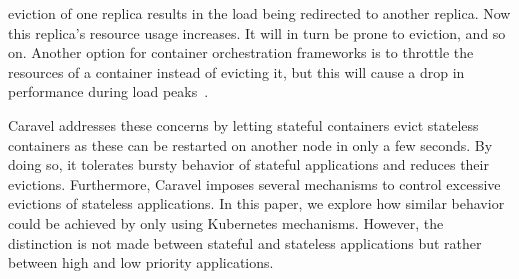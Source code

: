 eviction of one replica results in the load being redirected to another replica. Now this replica's resource usage increases. It will in turn be prone to eviction, and so on. Another option for container orchestration frameworks is to throttle the resources of a container instead of evicting it, but this will cause a drop in performance during load peaks~\citep{caravel}.

Caravel addresses these concerns by letting stateful containers evict stateless containers as these can be restarted on another node in only a few seconds. 
By doing so, it tolerates bursty behavior of stateful applications and reduces their evictions. Furthermore, Caravel imposes several mechanisms to control excessive evictions of stateless applications. In this paper, we explore how similar behavior could be achieved by only using Kubernetes mechanisms. However, the distinction is not made between stateful and stateless applications but rather between high and low priority applications. 

